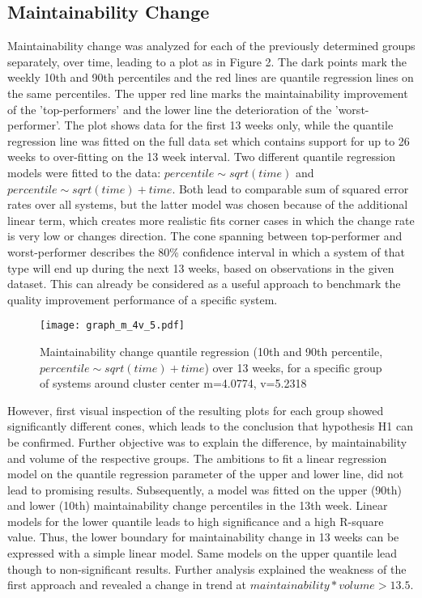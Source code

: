 \subsection{Maintainability Change}
Maintainability change was analyzed for each of the previously determined groups separately, over time, leading to a plot as in Figure 2. The dark points mark the weekly 10th and 90th percentiles and the red lines are quantile regression lines on the same percentiles. The upper red line marks the maintainability improvement of the 'top-performers' and the lower line the deterioration of the 'worst-performer'. The plot shows data for the first 13 weeks only, while the quantile regression line was fitted on the full data set which contains support for up to 26 weeks to over-fitting on the 13 week interval. Two different quantile regression models were fitted to the data: \(percentile\sim sqrt(time)\) and \(percentile\sim sqrt(time)+time\). Both lead to comparable sum of squared error rates over all systems, but the latter model was chosen because of the additional linear term, which creates more realistic fits corner cases in which the change rate is very low or changes direction. 
The cone spanning between top-performer and worst-performer describes the 80\% confidence interval in which a system of that type will end up during the next 13 weeks, based on observations in the given dataset. This can already be considered as a useful approach to benchmark the quality improvement performance of a specific system.
\begin{figure}[htbp!]
  \label{cone}
  \centering
  \texttt{[image: graph\_m\_4v\_5.pdf]}
  \caption{Maintainability change quantile regression (10th and 90th percentile, \(percentile\sim sqrt(time)+time\)) over 13 weeks, for a specific group of systems around cluster center m=4.0774, v=5.2318}
\end{figure}
However, first visual inspection of the resulting plots for each group showed significantly different cones, which leads to the conclusion that hypothesis H1 can be confirmed. Further objective was to explain the difference, by maintainability and volume of the respective groups. 
The ambitions to fit a linear regression model on the quantile regression parameter of the upper and lower line, did not lead to promising results. 
Subsequently, a model was fitted on the upper (90th) and lower (10th) maintainability change percentiles in the 13th week.  
Linear models for the lower quantile leads to high significance and a high R-square value. Thus, the lower boundary for maintainability change in 13 weeks can be expressed with a simple linear model. Same models on the upper quantile lead though to non-significant results. Further analysis explained the weakness of the first approach and revealed a change in trend at \(maintainability*volume>13.5\). 
